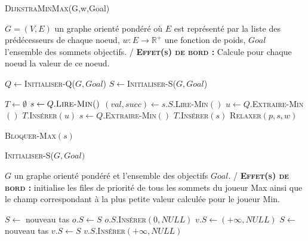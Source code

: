 \begin{algorithm}
	\caption{\textsc {DijkstraMinMax}(G,w,Goal)}
	 \label{algo:dijkMinMax}
	\begin{algorithmic}[1]
		\REQUIRE $G = (V,E)$ un graphe orienté pondéré où $E$ est représenté par la liste des prédécesseurs de chaque noeud, $w: E \rightarrow \mathbb{R}^{+}$ une fonction de poids, $Goal$ l'ensemble des sommets objectifs.
		\ENSURE / \textbf{\textsc{Effet(s) de bord :}} Calcule pour chaque noeud la valeur de ce noeud.
		
		\STATE $Q \leftarrow$\textsc{Initialiser-Q}($G,Goal$)
		\STATE $S \leftarrow$\textsc{Initialiser-S}($G,Goal$)
		
		\STATE $T \leftarrow \emptyset$
		 \label{lalgo:dijk4}
			\STATE $s \leftarrow Q.\textsc{Lire-Min()}$ \label{lalgo:dijk1}
			\STATE $(val,succ) \leftarrow s.S.$\textsc{Lire-Min}$()$ \label{lalgo:dijk6}
			 \label{lalgo:dijk7}
					\STATE $u \leftarrow Q.$\textsc{Extraire-Min}$()$
					\STATE $T.$\textsc{Insérer}$(u)$ \label{lalgo:dijk11}
			\ELSE \label{lalgo:dijk12}
				 \label{lalgo:dijk13}
					\STATE $s \leftarrow Q.$\textsc{Extraire-Min}$()$
					\STATE $T.$\textsc{Insérer}$(s)$
						\STATE \textsc{Relaxer}$(p,s,w)$ \label{lalgo:dijk2}
					\ENDFOR \label{lalgo:dijk18}
				
				
				\ELSE \label{lalgo:dijk19}
					\STATE \textsc{Bloquer-Max}$(s)$
				\ENDIF \label{lalgo:dijk21}
			\ENDIF\label{lalgo:dijk22}
		\ENDWHILE \label{lalgo:dijk23}
				
			
\end{algorithmic}
		
\end{algorithm}


\begin{algorithm}
	\caption{\textsc {Initialiser-S}($G,Goal)$}
	 \label{algo:initS}
	\begin{algorithmic}[1]
		\REQUIRE $G$ un graphe orienté pondéré et l'ensemble des objectifs $Goal$.
		\ENSURE / \textbf{\textsc{Effet(s) de bord :}} initialise les files de priorité de tous les sommets du joueur Max ainsi que le champ correspondant à la plus petite valeur calculée pour le joueur Min.
		
			\STATE $S \leftarrow$ nouveau tas
			\STATE $o.S \leftarrow S$
			\STATE $o.S.$\textsc{Insérer}$(0, NULL)$
		\ENDFOR
			\STATE $v.S \leftarrow (+\infty, NULL)$
		\ENDFOR
			\STATE $S \leftarrow$ nouveau tas
			\STATE $v.S \leftarrow S$
			\STATE $v.S.$\textsc{Insérer}$(+\infty, NULL)$
		\ENDFOR
		
	
			
\end{algorithmic}
		
\end{algorithm}

